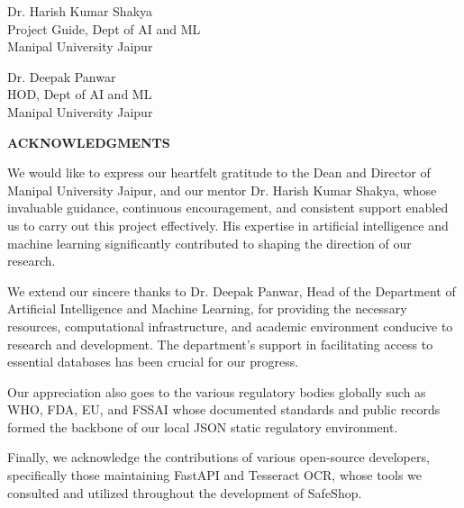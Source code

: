 \documentclass[12pt,a4paper]{report}
\begin{document}
\vspace{3cm}

\noindent
\begin{minipage}{0.5\textwidth}
Dr. Harish Kumar Shakya\\
Project Guide, Dept of AI and ML\\
Manipal University Jaipur
\end{minipage}%
\begin{minipage}{0.5\textwidth}
Dr. Deepak Panwar\\
HOD, Dept of AI and ML\\
Manipal University Jaipur
\end{minipage}

\newpage
\begin{center}
{\fontsize{14}{16}\bfseries ACKNOWLEDGMENTS}
\end{center}
\vspace{1cm}
We would like to express our heartfelt gratitude to the Dean and Director of Manipal University Jaipur, and our mentor Dr. Harish Kumar Shakya, whose invaluable guidance, continuous encouragement, and consistent support enabled us to carry out this project effectively. His expertise in artificial intelligence and machine learning significantly contributed to shaping the direction of our research.

We extend our sincere thanks to Dr. Deepak Panwar, Head of the Department of Artificial Intelligence and Machine Learning, for providing the necessary resources, computational infrastructure, and academic environment conducive to research and development. The department's support in facilitating access to essential databases has been crucial for our progress.

Our appreciation also goes to the various regulatory bodies globally such as WHO, FDA, EU, and FSSAI whose documented standards and public records formed the backbone of our local JSON static regulatory environment. 

Finally, we acknowledge the contributions of various open-source developers, specifically those maintaining FastAPI and Tesseract OCR, whose tools we consulted and utilized throughout the development of SafeShop.
\end{document}
